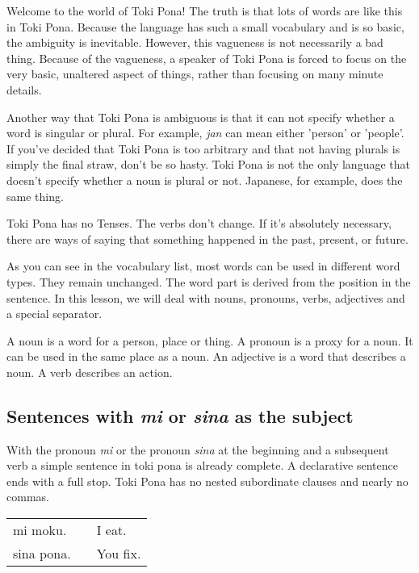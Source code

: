 Welcome to the world of Toki Pona! The truth is that lots of words are like this in Toki Pona. 
Because the language has such a small vocabulary and is so basic, the ambiguity is inevitable. 
However, this vagueness is not necessarily a bad thing. Because of the vagueness, a speaker of Toki Pona is forced to focus on the very basic, unaltered aspect of things, rather than focusing on many minute details. 

Another way that Toki Pona is ambiguous is that it can not specify whether a word is singular or plural. 
For example, \textit{jan} can mean either 'person' or 'people'. 
If you've decided that Toki Pona is too arbitrary and that not having plurals is simply the final straw, don't be so hasty. 
Toki Pona is not the only language that doesn't specify whether a noun is plural or not. 
Japanese, for example, does the same thing. 

Toki Pona has no Tenses. 
The verbs don't change. 
If it's absolutely necessary, there are ways of saying that something happened in the past, present, or future. 

As you can see in the vocabulary list, most words can be used in different word types. 
They remain unchanged. 
The word part is derived from the position in the sentence. 
In this lesson, we will deal with nouns, pronouns, verbs, adjectives and a special separator. 

A noun is a word for a person, place or thing. 
A pronoun is a proxy for a noun. It can be used in the same place as a noun. 
An adjective is a word that describes a noun. 
A verb describes an action. 
% 
\subsection*{Sentences with \textit{mi} or \textit{sina }as the subject}
%
With the pronoun \textit{mi} or the pronoun \textit{sina} at the beginning and a subsequent verb a simple sentence in toki pona is already complete. 
A declarative sentence ends with a full stop. 
Toki Pona has no nested subordinate clauses and nearly no commas. 

\begin{supertabular}{p{5,5cm}|ll}
mi moku. && I eat. \\
sina pona. && You fix. \\
\end{supertabular} 

